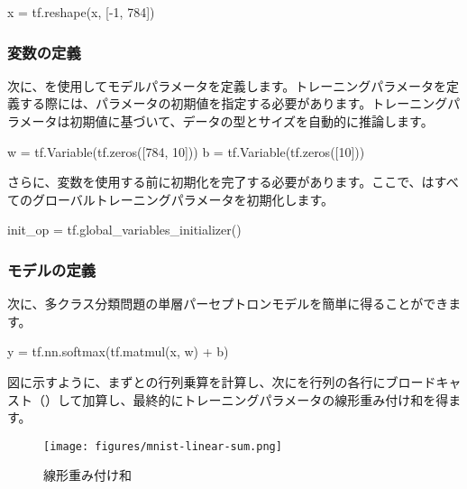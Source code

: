 \begin{content}
\begin{leftbar}
\begin{python}
x = tf.reshape(x, [-1, 784])
\end{python}
\end{leftbar}

\subsubsection{変数の定義}

次に、を使用してモデルパラメータを定義します。トレーニングパラメータを定義する際には、パラメータの初期値を指定する必要があります。トレーニングパラメータは初期値に基づいて、データの型とサイズを自動的に推論します。

\begin{leftbar}
\begin{python}
w = tf.Variable(tf.zeros([784, 10]))
b = tf.Variable(tf.zeros([10]))
\end{python}
\end{leftbar}

さらに、変数を使用する前に初期化を完了する必要があります。ここで、はすべてのグローバルトレーニングパラメータを初期化します。

\begin{leftbar}
\begin{python}
init_op = tf.global_variables_initializer()
\end{python}
\end{leftbar}

\subsubsection{モデルの定義}

次に、多クラス分類問題の単層パーセプトロンモデルを簡単に得ることができます。

\begin{leftbar}
\begin{python}
y = tf.nn.softmax(tf.matmul(x, w) + b)
\end{python}
\end{leftbar}

図に示すように、まずとの行列乗算を計算し、次にを行列の各行にブロードキャスト（）して加算し、最終的にトレーニングパラメータの線形重み付け和を得ます。

\begin{figure}[H]
\centering
\texttt{[image: figures/mnist-linear-sum.png]}
\caption{線形重み付け和}
 \label{fig:mnist-linear-sum}
\end{figure}


\end{content}
